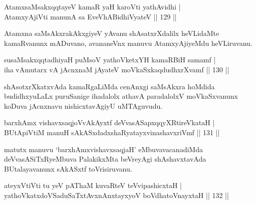 \begin{shl}
AtamxsaMsakxqqtayeV kamaR yaH karoVti yathAvidhi |\\
AtamxyAjiVti manunA sa EveVhABidhiVyateV \hfill || 129 ||
\end{shl}

\begin{artha}
Atamxna saMsAkxrakAkxgiyeV yAvanu shAsatxrXdalilx heVLidaMte kamaRvanunx mADuvano, avananeVnx manuvu AtamxyAjiyeMdu heVLiruvanu.
\end{artha}


\begin{shl}
susaMsakxqqtadhiyaH puMsoV yathoVketxYH kamaRBiH samamf |\\
iha vA\s mutarx vA jAcnxnaM jAyateV moVkaSxkaqdudhxrXvamf \hfill || 130 ||
\end{shl}

\begin{artha}
shAsotxrXkatxvAda kamaRgaLiMda cenAnxgi saMsAkxra hoMdida budidhxyuLaLx puruSanige ihadalolx athavA paradalolxV moVkaSxvanunx koDuva jAcnxnavu nishicxtavAgiyU uMTAguvudu.
\end{artha}

\begin{shl}
\footnotemark{}barxhAmx vishavxsaqjoVvAkAyxtf \footnotemark{}deVvasASapxqqyXRtireVkataH |\\
\footnotemark{}BUtApiVtiM manuH sAkASxdadxshaRyatayxvinashavxriVmf \hfill || 131 ||
\end{shl}
\begin{artha}
matutx manuvu `barxhAmxvishavxsaqjaH' eMbuvavacanadiMda deVvasASiTxRyeMbuva PalakikxMta beVreyAgi shAshavxtavAda BUtalayavanunx sAkASxtf toVrisiruvanu.
\end{artha}

\begin{shl}
ateyxVtiVti tu yeV pAThaM kuvaRteV teV\s vipashicxtaH |\\
yathoVkatxdoVSaduSaTxtAvxnAnxtayxyoV boVdhatoV\s nayxtaH \hfill || 132 ||
\end{shl}

